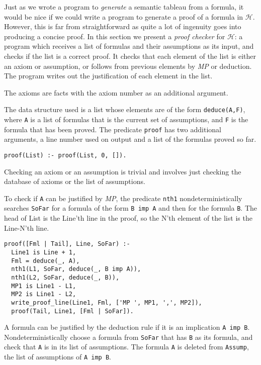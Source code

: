 \documentclass[11pt]{article}
\newcommand*{\p}[1]{\textup{\texttt{#1}}}
\begin{document}
Just as we wrote a program to \emph{generate} a semantic tableau from a
formula, it would be nice if we could write a program to generate a
proof of a formula in $\mathcal{H}$. However, this is far from
straightforward as quite a lot of ingenuity goes into producing a
concise proof. In this section we present a \emph{proof checker}
for $\mathcal{H}$: a program which receives a list of formulas and their
assumptions as its input, and checks if the list is a correct proof. It
checks that each element of the list is either an axiom or assumption,
or follows from previous elements by \emph{MP} or deduction. The program
writes out the justification of each element in the list.
 
The axioms are facts with the axiom number as an additional argument.

The data structure used is a list whose elements are of the form
\p{deduce(A,F)}, where \p{A} is a list of formulas that is the current
set of assumptions, and \p{F} is the formula that has been proved. The
predicate \p{proof} has two additional arguments, a line number used on
output and a list of the formulas proved so far.

\begin{verbatim}
proof(List) :- proof(List, 0, []).
\end{verbatim}

Checking an axiom or an assumption is trivial and involves just checking
the database of axioms or the list of assumptions.

To check if \p{A} can be justified by \emph{MP}, the predicate \p{nth1}
nondeterministically searches \p{SoFar} for a formula of the form \p{B
imp A} and then for the formula \p{B}. The head of List is the Line'th
line in the proof, so the N'th element of the list is the Line-N'th
line.

\begin{verbatim}
proof([Fml | Tail], Line, SoFar) :- 
  Line1 is Line + 1,
  Fml = deduce(_, A),
  nth1(L1, SoFar, deduce(_, B imp A)), 
  nth1(L2, SoFar, deduce(_, B)),
  MP1 is Line1 - L1,
  MP2 is Line1 - L2,
  write_proof_line(Line1, Fml, ['MP ', MP1, ',', MP2]),
  proof(Tail, Line1, [Fml | SoFar]).
\end{verbatim}

A formula can be justified by the deduction rule if it is an implication
\p{A imp B}. Nondeterministically choose a formula from \p{SoFar} that
has \p{B} as its formula, and check that \p{A} is in its list of
assumptions. The formula \p{A} is deleted from \p{Assump}, the list of
assumptions of \p{A imp B}.
\end{document}
